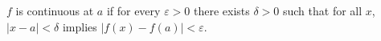 $f$ is continuous at $a$ if for every $\varepsilon > 0$ there exists $\delta > 0$ such that for all $x$, $\lvert x - a \rvert < \delta$ implies $\lvert f(x) - f(a) \rvert < \varepsilon$.